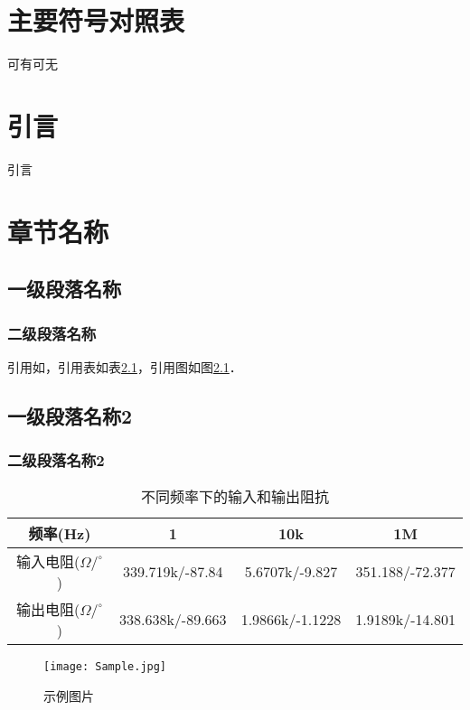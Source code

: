 \documentclass[UTF8,openany,AutoFakeBold,AutoFakeSlant,cs4size]{ctexbook}
\newcommand{\upcite}[1]{\textsuperscript{\cite{#1}}} %
\begin{document}
\chapter*{主要符号对照表}
可有可无
\clearpage

\setcounter{page}{1}

\chapter{引言}
引言

\chapter{章节名称}
\section{一级段落名称}
\subsection{二级段落名称}
引用如\upcite{lin2020cppm}，引用表如表\ref{tab:input_output_r}，引用图如图\ref{fig:sample}．


\section{一级段落名称2}
\subsection{二级段落名称2}

\begin{table}[h]
\small %
\centering
\caption{不同频率下的输入和输出阻抗}
\label{tab:input_output_r}
\begin{tabular}{cccc} %
\toprule %
频率(Hz) & 1 & 10k & 1M \\
\midrule
输入电阻($\Omega/^\circ$) & 339.719k/-87.84 & 5.6707k/-9.827 & 351.188/-72.377\\
输出电阻($\Omega/^\circ$) & 338.638k/-89.663 & 1.9866k/-1.1228 & 1.9189k/-14.801 \\
\bottomrule
\end{tabular}
\end{table}

\begin{figure}[h]
\centering
\texttt{[image: Sample.jpg]}
\caption{示例图片}
\label{fig:sample}
\end{figure}
\clearpage
\end{document}
